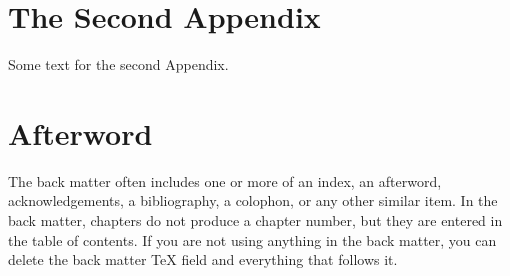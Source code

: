 \documentclass{book}%
\begin{document}
\chapter{The Second Appendix}

Some text for the second Appendix.

\backmatter

\chapter{Afterword}

The back matter often includes one or more of an index, an afterword,
acknowledgements, a bibliography, a colophon, or any other similar item. In
the back matter, chapters do not produce a chapter number, but they are
entered in the table of contents. If you are not using anything in the back
matter, you can delete the back matter TeX field and everything that follows it.


\renewcommand\bibname{References}
\setlength{\bibsep}{2\baselineskip}
\setlength\bibindent{.5in}



\printglossary
\end{document}
